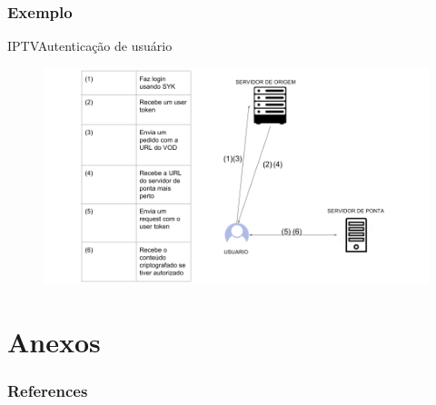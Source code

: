 \documentclass{beamer}
\begin{document}
\subsubsection{Exemplo}
\begin{frame}{IPTV}{Autentica\c{c}\~ao de usu\'ario}
\begin{figure} 
\includegraphics[width=13cm]{Figuras/autenticacao_vod.png} 
\label{figura:autenticacao_vod}
\end{figure}
\end{frame}
\section*{Anexos}


\begin{frame}[t, allowframebreaks]
\frametitle{References}


\end{frame}
\end{document}
